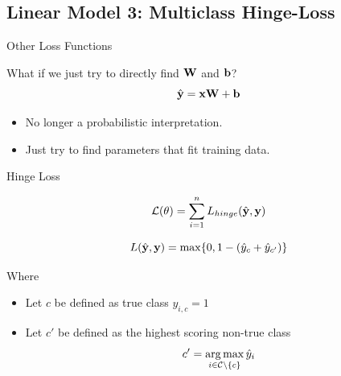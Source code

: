 \documentclass{beamer}
\begin{document}
\subsection{Linear Model 3: Multiclass Hinge-Loss}


\begin{frame}{Other Loss Functions}
  
  What if we just try to directly find $\mathbf{W}$ and $\mathbf{b}$? 
     \[\hat{\mathbf{y}} = \mathbf{x} \mathbf{W} + \mathbf{b}\]   
     
     \begin{itemize}
     \item No longer a probabilistic interpretation.
     \item Just try to find parameters that fit training data.
     \end{itemize}

\end{frame}


\begin{frame}{Hinge Loss}

  \[{\mathcal{L}(\theta)} = \sum_{i=1}^n L_{hinge}(\hat{\mathbf{y}}, \mathbf{y}) \] 


  \[ L(\hat{\mathbf{y}}, \mathbf{y}) =  \max\{0, 1 - (\hat{y}_{c} + \hat{y}_{c'}) \}  \]

  Where 
  \begin{itemize}
  \item   Let $c$ be defined as true class $y_{i, c} = 1$  
  \item   Let $c'$ be defined as the highest scoring non-true class 
    \[c' = \argmax_{i \in \mcC \setminus\{c\}} \hat{y}_i \] 
  \end{itemize}


\end{frame}




\end{document}
